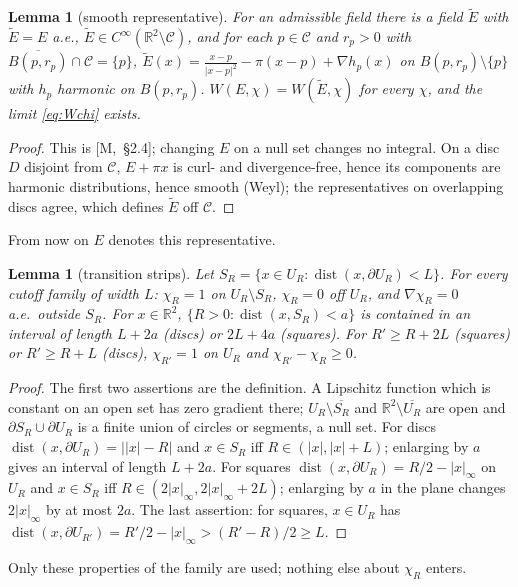 \documentclass[11pt,reqno]{amsart}
\numberwithin{equation}{section}
\theoremstyle{plain}
\newtheorem{lemma}[theorem]{Lemma}
\theoremstyle{definition}
\newcommand{\R}{\mathbb{R}}
\newcommand{\dist}{\operatorname{dist}}
\newcommand{\ms}[1]{\textup{[M,~#1]}}
\begin{document}
\begin{lemma}[smooth representative]\label{lem:rep}
For an admissible field there is a field $\tilde E$ with $\tilde E=E$ a.e., $\tilde E\in C^\infty(\R^2\setminus\mathcal C)$, and for each $p\in\mathcal C$ and $r_p>0$ with $\overline{B(p,r_p)}\cap\mathcal C=\{p\}$, $\tilde E(x)=\frac{x-p}{|x-p|^2}-\pi(x-p)+\nabla h_p(x)$ on $B(p,r_p)\setminus\{p\}$ with $h_p$ harmonic on $B(p,r_p)$.  $W(E,\chi)=W(\tilde E,\chi)$ for every $\chi$, and the limit \eqref{eq:Wchi} exists.
\end{lemma}
\begin{proof}
This is \ms{\S2.4}; changing $E$ on a null set changes no integral.  On a disc $D$ disjoint from $\mathcal C$, $E+\pi x$ is curl- and divergence-free, hence its components are harmonic distributions, hence smooth (Weyl); the representatives on overlapping discs agree, which defines $\tilde E$ off $\mathcal C$.
\end{proof}
From now on $E$ denotes this representative.

\begin{lemma}[transition strips]\label{lem:strip}
Let $S_R=\{x\in U_R:\dist(x,\partial U_R)<L\}$.  For every cutoff family of width $L$: $\chi_R=1$ on $U_R\setminus S_R$, $\chi_R=0$ off $U_R$, and $\nabla\chi_R=0$ a.e.\ outside $S_R$.  For $x\in\R^2$, $\{R>0:\dist(x,S_R)<a\}$ is contained in an interval of length $L+2a$ \textup{(}discs\textup{)} or $2L+4a$ \textup{(}squares\textup{)}.  For $R'\ge R+2L$ \textup{(}squares\textup{)} or $R'\ge R+L$ \textup{(}discs\textup{)}, $\chi_{R'}=1$ on $U_R$ and $\chi_{R'}-\chi_R\ge0$.
\end{lemma}
\begin{proof}
The first two assertions are the definition.  A Lipschitz function which is constant on an open set has zero gradient there; $U_R\setminus\overline{S_R}$ and $\R^2\setminus\overline{U_R}$ are open and $\partial S_R\cup\partial U_R$ is a finite union of circles or segments, a null set.  For discs $\dist(x,\partial U_R)=\big||x|-R\big|$ and $x\in S_R$ iff $R\in(|x|,|x|+L)$; enlarging by $a$ gives an interval of length $L+2a$.  For squares $\dist(x,\partial U_R)=R/2-|x|_\infty$ on $U_R$ and $x\in S_R$ iff $R\in(2|x|_\infty,2|x|_\infty+2L)$; enlarging by $a$ in the plane changes $2|x|_\infty$ by at most $2a$.  The last assertion: for squares, $x\in U_R$ has $\dist(x,\partial U_{R'})=R'/2-|x|_\infty>(R'-R)/2\ge L$.
\end{proof}
Only these properties of the family are used; nothing else about $\chi_R$ enters.
\end{document}
